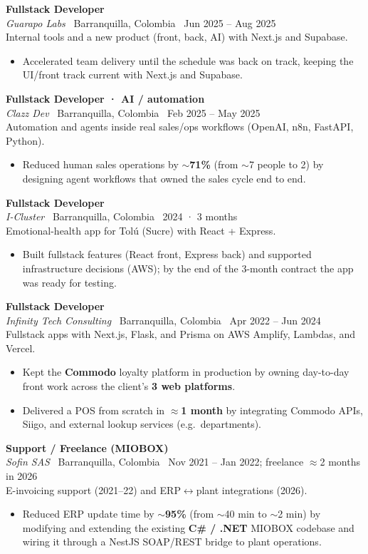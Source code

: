 \documentclass[10.5pt,a4paper]{article}
\newcommand{\Job}[4]{%
  \noindent\textbf{#1}\\[-0.05em]
  {\small\textit{#2} \textbar\ #4 \textbar\ #3}\\[0.15em]
}
\begin{document}
\vspace{0.35em}
\Job{Fullstack Developer}{Guarapo Labs}{Jun 2025 -- Aug 2025}{Barranquilla, Colombia}
Internal tools and a new product (front, back, AI) with Next.js and Supabase.
\begin{itemize}
  \item Accelerated team delivery until the schedule was back on track, keeping the
        UI/front track current with Next.js and Supabase.
\end{itemize}

\vspace{0.35em}
\Job{Fullstack Developer · AI / automation}{Clazz Dev}{Feb 2025 -- May 2025}{Barranquilla, Colombia}
Automation and agents inside real sales/ops workflows (OpenAI, n8n, FastAPI, Python).
\begin{itemize}
  \item Reduced human sales operations by $\sim$\textbf{71\%} (from $\sim$7 people to 2)
        by designing agent workflows that owned the sales cycle end to end.
\end{itemize}

\vspace{0.35em}
\Job{Fullstack Developer}{I-Cluster}{2024 · 3 months}{Barranquilla, Colombia}
Emotional-health app for Tolú (Sucre) with React + Express.
\begin{itemize}
  \item Built fullstack features (React front, Express back) and supported infrastructure
        decisions (AWS); by the end of the 3-month contract the app was ready for testing.
\end{itemize}

\vspace{0.35em}
\Job{Fullstack Developer}{Infinity Tech Consulting}{Apr 2022 -- Jun 2024}{Barranquilla, Colombia}
Fullstack apps with Next.js, Flask, and Prisma on AWS Amplify, Lambdas, and Vercel.
\begin{itemize}
  \item Kept the \textbf{Commodo} loyalty platform in production by owning day-to-day
        front work across the client's \textbf{3 web platforms}.
  \item Delivered a POS from scratch in $\approx$\textbf{1 month} by integrating Commodo
        APIs, Siigo, and external lookup services (e.g.\ departments).
\end{itemize}

\vspace{0.35em}
\Job{Support / Freelance (MIOBOX)}{Sofin SAS}{Nov 2021 -- Jan 2022; freelance $\approx$2 months in 2026}{Barranquilla, Colombia}
E-invoicing support (2021--22) and ERP$\leftrightarrow$plant integrations (2026).
\begin{itemize}
  \item Reduced ERP update time by $\sim$\textbf{95\%} (from $\sim$40 min to $\sim$2 min)
        by modifying and extending the existing \textbf{C\# / .NET} MIOBOX codebase and
        wiring it through a NestJS SOAP/REST bridge to plant operations.
\end{itemize}
\end{document}
